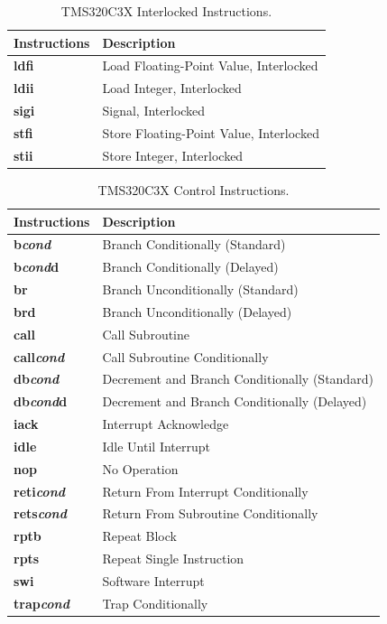 \begin{table}[!p]
\begin{center}
	\small
	\begin{tabular}{|p{3.0cm}|p{10.0cm}|}
	\hline
	\textbf{Instructions} & \textbf{Description}\\
	\hline
	\textbf{ldfi} & Load Floating-Point Value, Interlocked\\
	\hline
	\textbf{ldii} & Load Integer, Interlocked\\
	\hline
	\textbf{sigi} & Signal, Interlocked\\
	\hline
	\textbf{stfi} & Store Floating-Point Value, Interlocked\\
	\hline
	\textbf{stii} & Store Integer, Interlocked\\
	\hline
	\end{tabular}
	\caption{\label{table:tms320c3x_interlocked_instructions} TMS320C3X Interlocked Instructions.}
\end{center}
\end{table}

\begin{table}[!p]
\begin{center}
	\small
	\begin{tabular}{|p{3.0cm}|p{10.0cm}|}
	\hline
	\textbf{Instructions} & \textbf{Description}\\
	\hline
	\textbf{b\textit{cond}} & Branch Conditionally (Standard)\\
	\hline
	\textbf{b\textit{cond}d} & Branch Conditionally (Delayed)\\
	\hline
	\textbf{br} & Branch Unconditionally (Standard)\\
	\hline
	\textbf{brd} & Branch Unconditionally (Delayed)\\
	\hline
	\textbf{call} & Call Subroutine\\
	\hline
	\textbf{call\textit{cond}} & Call Subroutine Conditionally\\
	\hline
	\textbf{db\textit{cond}} & Decrement and Branch Conditionally (Standard)\\
	\hline
	\textbf{db\textit{cond}d} & Decrement and Branch Conditionally (Delayed)\\
	\hline
	\textbf{iack} & Interrupt Acknowledge\\
	\hline
	\textbf{idle} & Idle Until Interrupt\\
	\hline
	\textbf{nop} & No Operation\\
	\hline
	\textbf{reti\textit{cond}} & Return From Interrupt Conditionally\\
	\hline
	\textbf{rets\textit{cond}} & Return From Subroutine Conditionally\\
	\hline
	\textbf{rptb} & Repeat Block\\
	\hline
	\textbf{rpts} & Repeat Single Instruction\\
	\hline
	\textbf{swi} & Software Interrupt\\
	\hline
	\textbf{trap\textit{cond}} & Trap Conditionally\\
	\hline
	\end{tabular}
	\caption{\label{table:tms320c3x_control_instructions} TMS320C3X Control Instructions.}
\end{center}
\end{table}

